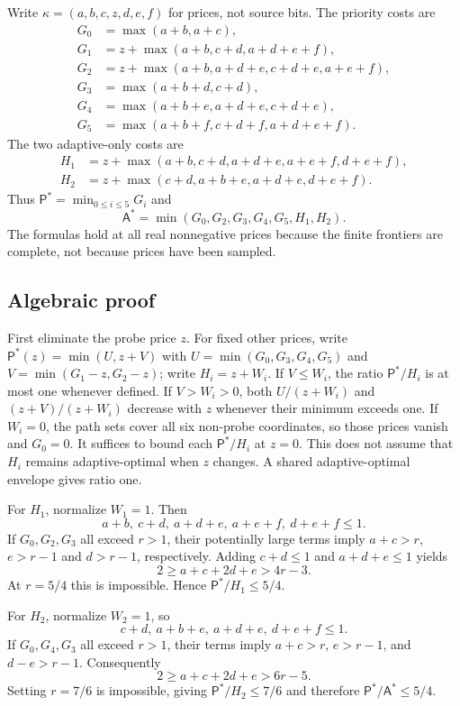 \documentclass[pdflatex,sn-mathphys-num]{sn-jnl}
\newcommand{\A}{\mathsf{A}}
\newcommand{\Pcost}{\mathsf{P}}
\theoremstyle{thmstyleone}
\theoremstyle{thmstylethree}
\theoremstyle{thmstyletwo}
\begin{document}
Write $\kappa=(a,b,c,z,d,e,f)$ for prices, not source bits. The priority costs are
\begin{align*}
G_0&=\max(a+b,a+c),\\
G_1&=z+\max(a+b,c+d,a+d+e+f),\\
G_2&=z+\max(a+b,a+d+e,c+d+e,a+e+f),\\
G_3&=\max(a+b+d,c+d),\\
G_4&=\max(a+b+e,a+d+e,c+d+e),\\
G_5&=\max(a+b+f,c+d+f,a+d+e+f).
\end{align*}
The two adaptive-only costs are
\begin{align*}
H_1&=z+\max(a+b,c+d,a+d+e,a+e+f,d+e+f),\\
H_2&=z+\max(c+d,a+b+e,a+d+e,d+e+f).
\end{align*}
Thus $\Pcost^*=\min_{0\leq i\leq5}G_i$ and
\[
 \A^*=\min(G_0,G_2,G_3,G_4,G_5,H_1,H_2).
\]
The formulas hold at all real nonnegative prices because the finite frontiers are complete, not because prices have been sampled.

\subsection{Algebraic proof}
First eliminate the probe price $z$. For fixed other prices, write $\Pcost^*(z)=\min(U,z+V)$ with $U=\min(G_0,G_3,G_4,G_5)$ and $V=\min(G_1-z,G_2-z)$; write $H_i=z+W_i$. If $V\leq W_i$, the ratio $\Pcost^*/H_i$ is at most one whenever defined. If $V>W_i>0$, both $U/(z+W_i)$ and $(z+V)/(z+W_i)$ decrease with $z$ whenever their minimum exceeds one. If $W_i=0$, the path sets cover all six non-probe coordinates, so those prices vanish and $G_0=0$. It suffices to bound each $\Pcost^*/H_i$ at $z=0$. This does not assume that $H_i$ remains adaptive-optimal when $z$ changes. A shared adaptive-optimal envelope gives ratio one.

For $H_1$, normalize $W_1=1$. Then
\[
a+b,\ c+d,\ a+d+e,\ a+e+f,\ d+e+f\leq1.
\]
If $G_0,G_2,G_3$ all exceed $r>1$, their potentially large terms imply $a+c>r$, $e>r-1$ and $d>r-1$, respectively. Adding $c+d\leq1$ and $a+d+e\leq1$ yields
\[
2\geq a+c+2d+e>4r-3.
\]
At $r=5/4$ this is impossible. Hence $\Pcost^*/H_1\leq5/4$.

For $H_2$, normalize $W_2=1$, so
\[
c+d,\ a+b+e,\ a+d+e,\ d+e+f\leq1.
\]
If $G_0,G_4,G_3$ all exceed $r>1$, their terms imply $a+c>r$, $e>r-1$, and $d-e>r-1$. Consequently
\[
2\geq a+c+2d+e>6r-5.
\]
Setting $r=7/6$ is impossible, giving $\Pcost^*/H_2\leq7/6$ and therefore $\Pcost^*/\A^*\leq5/4$.
\end{document}

